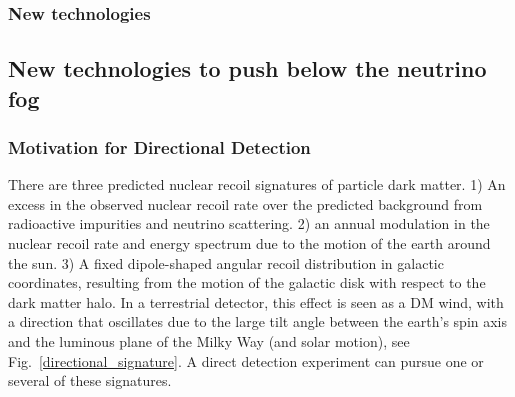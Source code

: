 



%









\subsubsection{New technologies}




\subsection{New technologies to push below the neutrino fog}
\label{sec:beyondnufog}
\subsubsection{Motivation for Directional Detection}


There are three predicted nuclear recoil signatures of particle dark matter. 1) An excess in the observed nuclear recoil rate over the predicted background from radioactive impurities and neutrino scattering. 2) an annual modulation in the nuclear recoil rate and energy spectrum due to the motion of the earth around the sun. 3) A fixed dipole-shaped angular recoil distribution in galactic coordinates, resulting from the motion of the galactic disk with respect to the dark matter halo. In a terrestrial detector, this effect is seen as a DM wind, with a direction that oscillates due to the large tilt angle between the earth's spin axis and the luminous plane of the Milky Way (and solar motion), see Fig.~\ref{directional_signature}. A direct detection experiment can pursue one or several of these signatures.

